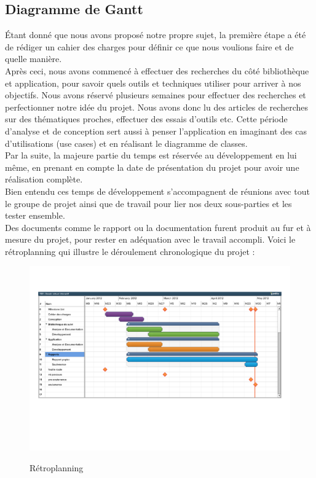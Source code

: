\documentclass{report}
\begin{document}
			\subsection{Diagramme de Gantt}
			Étant donné que nous avons proposé notre propre sujet, la première étape a été de rédiger un cahier des charges pour définir ce que nous voulions faire et de quelle manière. \\
			Après ceci, nous avons commencé à effectuer des recherches du côté bibliothèque et application, pour savoir quels outils et techniques utiliser pour arriver à nos objectifs. 
		  Nous avons réservé plusieurs semaines pour effectuer des recherches et perfectionner notre idée du projet. Nous avons donc lu des articles de recherches sur des thématiques proches, effectuer des essais d'outils etc. Cette période d'analyse et de conception sert aussi à penser l'application en imaginant des cas d'utilisations (use cases) et en réalisant le diagramme de classes. \\
			
			Par la suite, la majeure partie du temps est réservée au développement en lui même, en prenant en compte la date de présentation du projet pour avoir une réalisation complète. \\  
			Bien entendu ces temps de développement s'accompagnent de réunions avec tout le groupe de projet ainsi que de travail pour lier nos deux sous-parties et les tester ensemble. \\
			Des documents comme le rapport ou la documentation furent produit au fur et à mesure du projet, pour rester en adéquation avec le travail accompli. Voici le rétroplanning qui illustre le déroulement chronologique du projet : \\
				\begin{figure}[!h]
					\centering
					\includegraphics[scale=0.6]{../soutenance/retro-planning.pdf}\\
					\caption{Rétroplanning}
					\label{Rétroplanning}
				\end{figure}
		\newpage
\end{document}
